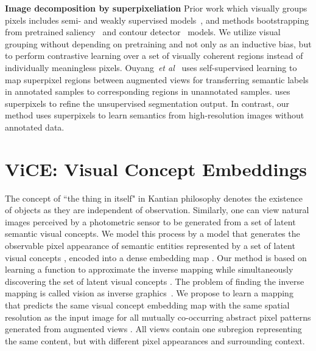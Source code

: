\documentclass{bmvc2k}
\def\etal{\emph{et al}\bmvaOneDot}
\begin{document}
\noindent
\textbf{Image decomposition by superpixeliation} Prior work which visually groups pixels includes semi- and weakly supervised models~\cite{Franchi2021RobustSS, Yi2022WeaklysupervisedSSGuided, Kwak2017WeaklySSPooling}, and methods bootstrapping from pretrained saliency~\cite{VanGansbeke2021UnsupervisedSS} and contour detector~\cite{Zhang2020UnsupHiearchicalGrouping, Hwang2019SegSort, Ke2022UnsupervisedHS} models. We utilize visual grouping without depending on pretraining and not only as an inductive bias, but to perform contrastive learning over a set of visually coherent regions instead of individually meaningless pixels. Ouyang~\etal~\cite{Ouyang2020SelfSupSuperpixels} uses self-supervised learning to map superpixel regions between augmented views for transferring semantic labels in annotated samples to corresponding regions in unannotated samples. \cite{Kanezaki2018UnsupSegSuperpixels, Mirsadeghi2021InMARS} uses superpixels to refine the unsupervised segmentation output. In contrast, our method uses superpixels to learn semantics from high-resolution images without annotated data.

\section{ViCE: Visual Concept Embeddings}
\label{sec:vice}

The concept of ``the thing in itself" in Kantian philosophy denotes the existence of objects as they are independent of observation. Similarly, one can view natural images perceived by a photometric sensor to be generated from a set of latent semantic visual concepts. We model this process by a model  that generates the observable pixel appearance  of semantic entities represented by a set of latent visual concepts , encoded into a dense embedding map . Our method is based on learning a function  to approximate the inverse mapping  while simultaneously discovering the set of latent visual concepts . The problem of finding the inverse mapping is called vision as inverse graphics~\cite{Kersten2004PerceptionBayesianInf, Kersten2006AnalysisSynthesis, Comellas2019VisionInvGraphics}. We propose to learn a mapping  that predicts the same visual concept embedding map  with the same spatial resolution as the input image  for all mutually co-occurring abstract pixel patterns generated from augmented views . All views contain one subregion representing the same content, but with different pixel appearances and surrounding context.
\end{document}
